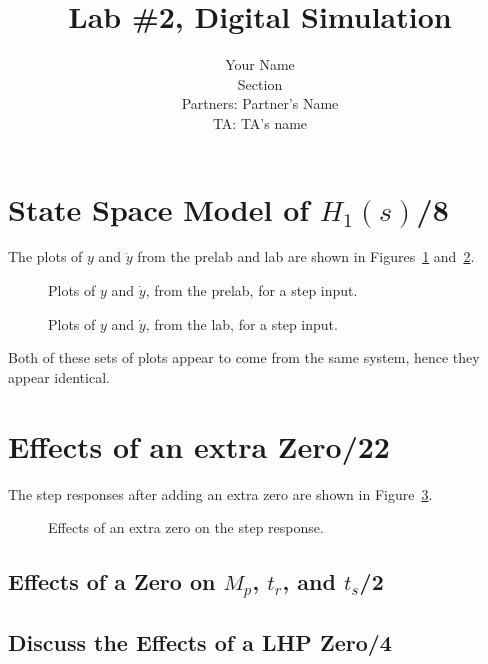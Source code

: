\documentclass{article}
\title{Lab \#2, {\sc Digital Simulation}}
\author{Your Name\\ Section\\
  Partners: Partner's Name\\
  TA: TA's name}
\newcommand{\score}{\hfill \underline{\hspace{1cm}}/}
\begin{document}
\maketitle
{}
\section{{\sc State Space Model of} $H_1(s)$\score 8}

The plots of $y$ and $\dot{y}$ from the prelab and lab are shown in Figures~\ref{srpl} and~\ref{srl}.

\begin{figure}[htbp]
\centering
\caption{Plots of $y$ and $\dot{y}$, from the prelab, for a step input.}
\label{srpl}
\end{figure}

\begin{figure}[htbp]
\centering
\caption{Plots of $y$ and $\dot{y}$, from the lab, for a step input.}
\label{srl}
\end{figure}

Both of these sets of plots appear to come from the same system, hence they appear identical.

\section{{\sc Effects of an extra Zero}\score 22}
The step responses after adding an extra zero are shown in Figure~\ref{ezero}.

\begin{figure}[htbp]
\centering
\caption{Effects of an extra zero on the step response.}
\label{ezero}
\end{figure}

\subsection{Effects of a Zero on $M_p$, $t_r$, and $t_s$\score 2}

%

\subsection{Discuss the Effects of a LHP Zero\score 4}
\end{document}
